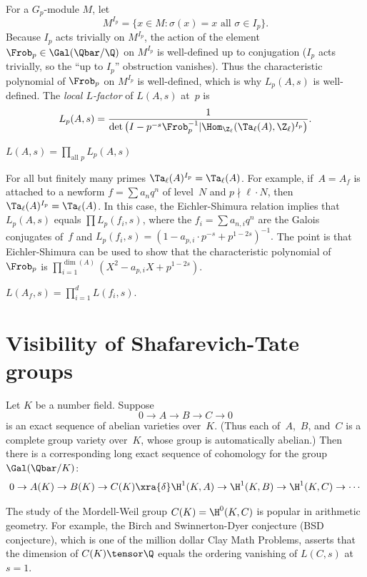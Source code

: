 \documentclass{report}
\begin{document}
For a $G_p$-module $M$, let
$$
M^{I_p} = \{x \in M : \sigma(x) = x\text{ all } \sigma\in I_p\}.
$$
Because $I_p$ acts trivially on $M^{I_p}$, the action of the
element $\Frob_p\in\Gal(\Qbar/\Q)$ on $M^{I_p}$ is well-defined up to
conjugation ($I_p$ acts trivially, so the ``up to $I_p$'' obstruction
vanishes).  Thus the characteristic polynomial of $\Frob_p$ on $M^{I_p}$
is well-defined, which is why $L_p(A,s)$ is well-defined.
The {\em local $L$-factor} of $L(A,s)$ at~$p$ is
$$
  L_p(A,s) =
\frac{1}{
       \det\left(I-p^{-s}
              \Frob_p^{-1}|\Hom_{\Z_\ell}(\Ta_{\ell}(A),\Z_{\ell})^{I_p}\right)}.
$$


\begin{definition}
$\displaystyle{} L(A,s) = \prod_{\text{all }p} L_p(A,s)$
\end{definition}

For all but finitely many primes $\Ta_{\ell}(A)^{I_p} =
\Ta_{\ell}(A)$.  For example, if~$A=A_f$ is attached to a newform
$f=\sum a_n q^n$ of level~$N$ and $p\nmid \ell\cdot N$, then
$\Ta_{\ell}(A)^{I_p} = \Ta_{\ell}(A)$.  In this case, the
Eichler-Shimura relation implies that $L_p(A,s)$ equals $\prod
L_p(f_i,s)$, where the $f_i=\sum a_{n,i}q^n$ are the Galois conjugates
of~$f$ and $L_p(f_i,s) = (1 - a_{p,i} \cdot p^{-s} + p^{1-2s})^{-1}.$
The point is that Eichler-Shimura can be used to show that the
characteristic polynomial of $\Frob_p$ is $\prod_{i=1}^{\dim(A)} (X^2
- a_{p,i}X + p^{1-2s})$.
\begin{theorem}
$L(A_f,s) = \prod_{i=1}^d L(f_i,s)$.
\end{theorem}


\section{Visibility of Shafarevich-Tate groups}
Let $K$ be a number field.  Suppose
\[
  0 \to A \to B \to C \to 0
\]
is an exact sequence of abelian varieties over~$K$.  (Thus each
of~$A$,~$B$, and~$C$ is a complete group variety over~$K$, whose group
is automatically abelian.)  Then there is a corresponding long exact
sequence of cohomology for the group $\Gal(\Qbar/K)$:
\[
  0 \to A(K) \to B(K) \to C(K) \xra{\delta} \H^1(K,A) \to \H^1(K,B)\to
    \H^1(K,C) \to \cdots
\]

The study of the Mordell-Weil group $C(K)=\H^0(K,C)$ is popular in
arithmetic geometry.  For example, the Birch and Swinnerton-Dyer
conjecture (BSD conjecture), which is one of the million dollar Clay
Math Problems, asserts that the dimension of $C(K)\tensor\Q$ equals
the ordering vanishing of $L(C,s)$ at $s=1$.
\end{document}
